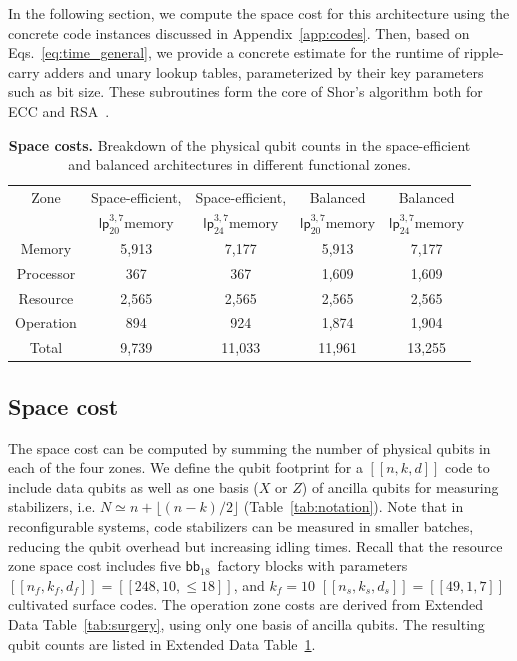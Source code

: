 \documentclass[reprint,twocolumn,secnumarabic,amssymb, aps, prx]{revtex4-2}
\newcommand{\bbparams}{\mbox{$[[248, 10, \leq 18]]$}}
\newcommand{\bb}{\mbox{$\mathsf{bb}_{18}$}}
\newcommand{\lpmemlarge}{\mbox{$\mathsf{lp}_{24}^{3, 7}$}}
\newcommand{\lpmemmed}{\mbox{$\mathsf{lp}^{3, 7}_{20}$}}
\newcommand{\nf}{n_f}
\newcommand{\kf}{k_f}
\newcommand{\df}{d_f}
\newcommand{\ns}{n_s}
\newcommand{\ks}{k_s}
\newcommand{\ds}{d_s}
\begin{document}
In the following section, we compute the space cost for this architecture using the concrete code instances discussed in Appendix~\ref{app:codes}. Then, based on Eqs.~\eqref{eq:time_general}, we provide a concrete estimate for the runtime of ripple-carry adders and unary lookup tables, parameterized by their key parameters such as bit size. These subroutines form the core of Shor's algorithm both for ECC and RSA~\cite{jones2012layered, fowler2012surface, ogorman2017quantum, gheorghiu2019benchmarking, gidney2019how, dallairedemers2025brace, gidney2025how, zhou2025resource, webster2026pinnacle, chevignard2025reducing, proos2003shor, roetteler2017quantum, haner2020improved, litinski2023compute, gouzien2023performance, babbush2026quantum}.

\begin{table}[t!]
\caption{\textbf{Space costs.} Breakdown of the physical qubit counts in the space-efficient and balanced architectures in different functional zones.
\label{tab:space_breakdown}
}
\centering
\begin{ruledtabular}
\begin{tabular}{ccccc}
Zone & Space-efficient, & Space-efficient, & Balanced  & Balanced\\
 & \lpmemmed memory & \lpmemlarge memory & \lpmemmed memory & \lpmemlarge memory\\

\hline
Memory & 5{,}913 & 7{,}177 & 5{,}913 & 7{,}177 \\
Processor & 367 & 367 & 1{,}609 & 1{,}609 \\
Resource & 2{,}565 & 2{,}565 & 2{,}565 & 2{,}565 \\
Operation & 894 & 924 & 1{,}874 & 1{,}904
 \\
\hline
Total & 9{,}739 & 11{,}033 & 11{,}961 & 13{,}255
 \\
\end{tabular}
\end{ruledtabular}
\end{table}


\subsection{Space cost \label{app:space_cost}}
The space cost can be computed by summing the number of physical qubits in each of the four zones. We define the qubit footprint for a $[[n, k, d]]$ code to include data qubits as well as one basis ($X$ or $Z$) of ancilla qubits for measuring stabilizers, i.e. \mbox{$N\simeq n+\lfloor(n-k)/2\rfloor$} (Table~\ref{tab:notation}). Note that in reconfigurable systems, code stabilizers can be measured in smaller batches, reducing the qubit overhead but increasing idling times. Recall that the resource zone space cost includes five \bb\ factory blocks with parameters \mbox{$[[\nf, \kf, \df]]=\bbparams$}, and $\kf=10$ \mbox{$[[\ns, \ks, \ds]]=[[49,1,7]]$} cultivated surface codes. The operation zone costs are derived from Extended Data Table~\ref{tab:surgery}, using only one basis of ancilla qubits. The resulting qubit counts are listed in Extended Data Table~\ref{tab:space_breakdown}.
\end{document}
